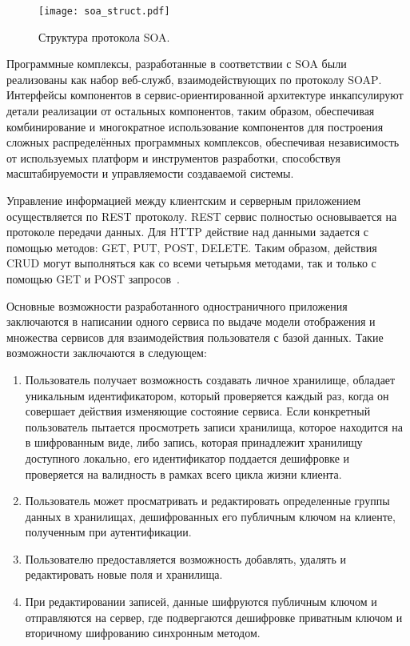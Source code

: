 \begin{figure}[ht]
\centering
  \texttt{[image: soa\_struct.pdf]}
  \caption{ Структура протокола SOA. }
  \label{fig:domain:bayes_net}
\end{figure}

Программные комплексы, разработанные в соответствии с \foreignlanguage{english}{SOA} были реализованы как набор веб-служб, взаимодействующих по протоколу \foreignlanguage{english}{SOAP}. Интерфейсы компонентов в сервис-ориентированной архитектуре инкапсулируют детали реализации от остальных компонентов, таким образом, обеспечивая комбинирование и многократное использование компонентов для построения сложных распределённых программных комплексов, обеспечивая независимость от используемых платформ и инструментов разработки, способствуя масштабируемости и управляемости создаваемой системы.

Управление информацией между клиентским и серверным приложением осуществляется по REST протоколу. REST сервис полностью основывается на протоколе передачи данных. Для HTTP действие над данными задается с помощью методов: GET, PUT, POST, DELETE. Таким образом, действия CRUD могут выполняться как со всеми четырьмя методами, так и только с помощью GET и POST запросов~\cite{restfull}.

Основные возможности разработанного одностраничного приложения заключаются в написании одного сервиса по выдаче модели отображения и множества сервисов для взаимодействия пользователя с базой данных. Такие возможности заключаются в следующем:
\begin{enumerate}
  \item Пользователь получает возможность создавать личное хранилище, обладает уникальным идентификатором, который проверяется каждый раз, когда он совершает действия изменяющие состояние сервиса. Если конкретный пользователь пытается просмотреть записи хранилища, которое находится на в шифрованным виде, либо запись, которая принадлежит хранилищу доступного локально, его идентификатор поддается дешифровке и проверяется на валидность в рамках всего цикла жизни клиента.
  \item Пользователь может просматривать и редактировать определенные группы данных в хранилищах, дешифрованных его публичным ключом на клиенте, полученным при аутентификации.
  \item Пользователю предоставляется возможность добавлять, удалять и редактировать новые поля и хранилища.
  \item При редактировании записей, данные шифруются публичным ключом и отправляются на сервер, где подвергаются дешифровке приватным ключом и вторичному шифрованию синхронным методом.
\end{enumerate}

